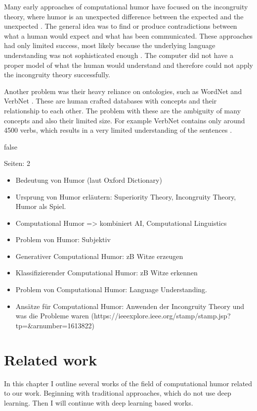 \documentclass[draft,final,oneside]{vutinfth} %
\begin{document}
Many early approaches of computational humor have focused on the incongruity theory, where humor is an unexpected difference between the expected and the unexpected \cite{comphumorsummary}. The general idea was to find or produce contradictions between what a human would expect and what has been communicated. These approaches had only limited success, most likely because the underlying language understanding was not sophisticated enough \cite{comphumorsummary}. The computer did not have a proper model of what the human would understand and therefore could not apply the incongruity theory successfully.

Another problem was their heavy reliance on ontologies, such as WordNet and VerbNet \cite{comphumorsummary}\cite{wordnet}. These are human crafted databases with concepts and their relationship to each other. The problem with these are the ambiguity of many concepts and also their limited size. For example VerbNet contains only around 4500 verbs, which results in a very limited understanding of the sentences \cite{verbnet}. 	


\if false

Seiten: 2
\begin{itemize}
\item Bedeutung von Humor (laut Oxford Dictionary)
\item Ursprung von Humor erläutern: Superiority Theory, Incongruity Theory, Humor als Spiel.
\item Computational Humor => kombiniert AI, Computational Linguistics
\item Problem von Humor: Subjektiv
\item Generativer Computational Humor: zB Witze erzeugen
\item Klassifizierender Computational Humor: zB Witze erkennen
\item Problem von Computational Humor: Language Understanding.
\item Ansätze für Computational Humor: Anwenden der Incongruity Theory und was die Probleme waren (https://ieeexplore.ieee.org/stamp/stamp.jsp?tp=\&arnumber=1613822)
\end{itemize}
\fi


\section{Related work} \label{relatedworkbackground}

In this chapter I outline several works of the field of computational humor related to our work. Beginning with traditional approaches, which do not use deep learning. Then I will continue with deep learning based works.
\end{document}
